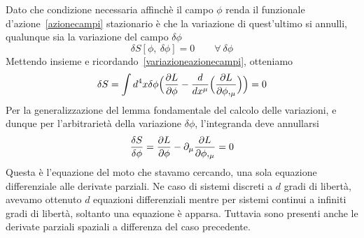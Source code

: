     Dato che condizione necessaria affinchè il campo $\phi$ renda il funzionale d'azione~\eqref{azionecampi} stazionario è che la variazione di quest'ultimo si annulli, qualunque sia la variazione del campo $\delta \phi$
\begin{equation}
    \delta S[\phi, ~ \delta \phi] = 0 \qquad \forall ~ \delta \phi
\end{equation}
    Mettendo insieme e ricordando~\eqref{variazioneazionecampi}, otteniamo
\begin{equation*}
    \delta S = \int d^4 x \delta \phi \Big (\frac{\partial L}{\partial\phi} - \frac{d}{dx^\mu} \Big (\frac{\partial L}{\partial\phi,_\mu} \Big) \Big)  = 0
\end{equation*}
    Per la generalizzazione del lemma fondamentale del calcolo delle variazioni, e dunque per l'arbitrarietà della variazione $\delta \phi$, l'integranda deve annullarsi
\begin{equation} \label{eullagcampi}
    \frac{\delta S}{\delta \phi} = \frac{\partial L}{\partial\phi} - \partial_\mu \frac{\partial L}{\partial\phi,_\mu} = 0
\end{equation}
    Questa è l'equazione del moto che stavamo cercando, una sola equazione differenziale alle derivate parziali. Ne caso di sistemi discreti a $d$ gradi di libertà, avevamo ottenuto $d$ equazioni differenziali mentre per sistemi continui a infiniti gradi di libertà, soltanto una equazione è apparsa. Tuttavia sono presenti anche le derivate parziali spaziali a differenza del caso precedente.


